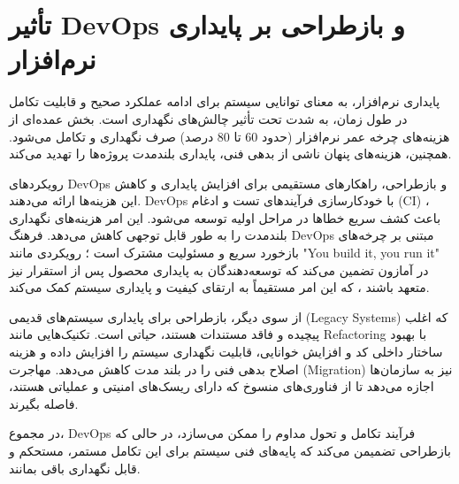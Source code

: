 \section{تأثیر DevOps و بازطراحی بر پایداری نرم‌افزار}
\label{sec:ch6-devops-reeng-sustainability}

پایداری نرم‌افزار، به معنای توانایی سیستم برای ادامه عملکرد صحیح و قابلیت تکامل در طول زمان، به شدت تحت تأثیر چالش‌های نگهداری است. بخش عمده‌ای از هزینه‌های چرخه عمر نرم‌افزار (حدود 60 تا 80 درصد) صرف نگهداری و تکامل می‌شود. همچنین، هزینه‌های پنهان ناشی از بدهی فنی، پایداری بلندمدت پروژه‌ها را تهدید می‌کند.

رویکردهای DevOps و بازطراحی، راهکارهای مستقیمی برای افزایش پایداری و کاهش این هزینه‌ها ارائه می‌دهند. DevOps با خودکارسازی فرآیندهای تست و ادغام (CI) ، باعث کشف سریع خطاها در مراحل اولیه توسعه می‌شود. این امر هزینه‌های نگهداری بلندمدت را به طور قابل توجهی کاهش می‌دهد. فرهنگ DevOps مبتنی بر چرخه‌های بازخورد سریع و مسئولیت مشترک است ؛ رویکردی مانند "You build it, you run it" در آمازون تضمین می‌کند که توسعه‌دهندگان به پایداری محصول پس از استقرار نیز متعهد باشند ، که این امر مستقیماً به ارتقای کیفیت و پایداری سیستم کمک می‌کند.

از سوی دیگر، بازطراحی برای پایداری سیستم‌های قدیمی (Legacy Systems) که اغلب پیچیده و فاقد مستندات هستند، حیاتی است. تکنیک‌هایی مانند Refactoring با بهبود ساختار داخلی کد و افزایش خوانایی، قابلیت نگهداری سیستم را افزایش داده و هزینه اصلاح بدهی فنی را در بلند مدت کاهش می‌دهد. مهاجرت (Migration) نیز به سازمان‌ها اجازه می‌دهد تا از فناوری‌های منسوخ که دارای ریسک‌های امنیتی و عملیاتی هستند، فاصله بگیرند.

در مجموع، DevOps فرآیند تکامل و تحول مداوم را ممکن می‌سازد، در حالی که بازطراحی تضمیمن می‌کند که پایه‌های فنی سیستم برای این تکامل مستمر، مستحکم و قابل نگهداری باقی بمانند.
